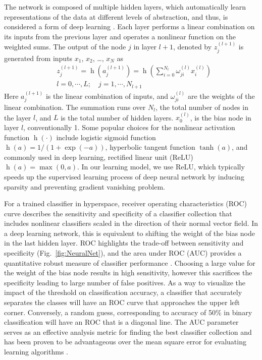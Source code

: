 \documentclass[aps,pra,reprint,superscriptaddress]{revtex4-1}
\DeclareMathOperator{\h}{h} %
\begin{document}
The network is composed of multiple hidden layers, which automatically learn representations of the data at different levels of abstraction, and thus, is considered a form of deep learning \cite{lecun2015deep, schmidhuber2015deep}. Each layer performs a linear combination on its inputs from the previous layer and operates a nonlinear function on the weighted sums. The output of the node $j$ in layer $l+1$, denoted by $z_j^{(l+1)}$ is generated from inputs $x_1$, $x_2$, \ldots, $x_N$ as
\begin{equation}
\begin{split}
& z_j^{(l+1)} = \h(a_j^{(l+1)}) = \h(\sum_{i=0}^{N_l} \omega_{ji}^{(l)} x_i^{(l)})\\
& l=0,\cdots,L;\quad j=1,\cdots,N_{l+1}
\end{split}
\end{equation}
Here $a_j^{(l+1)}$ is the linear combination of inputs, and $\omega_{ji}^{(l)}$ are the weights of the linear combination. The summation runs over $N_l$, the total number of nodes in the layer $l$, and $L$ is the total number of hidden layers. $x_0^{(l)}$, is the bias node in layer $l$, conventionally 1. Some popular choices for the nonlinear activation function $\h(\cdot)$ include logistic sigmoid function $\h(a)=1/(1+\exp(-a))$, hyperbolic tangent function $\tanh(a)$, and commonly used in deep learning, rectified linear unit (ReLU) $\h(a) = \max(0,a)$. In our learning model, we use ReLU, which typically speeds up the supervised learning process of deep neural network by inducing sparsity and preventing gradient vanishing problem. 

For a trained classifier in hyperspace, receiver operating characteristics (ROC) curve describes the sensitivity and specificity of a classifier collection that includes nonlinear classifiers scaled in the direction of their normal vector field. In a deep learning network, this is equivalent to shifting the weight of the bias node in the last hidden layer. ROC highlights the trade-off between sensitivity and specificity (Fig.~\ref{fig:NeuralNet}), and the area under ROC (AUC) provides a quantitative robust measure of classifier performance \cite{hanley1982meaning, ling2003auc, cortes2004auc, liu2008roc}. Choosing a large value for the weight of the bias node results in high sensitivity, however this sacrifices the specificity leading to large number of false positives. As a way to visualize the impact of the threshold on classification accuracy, a classifier that accurately separates the classes will have an ROC curve that approaches the upper left corner. Conversely, a random guess, corresponding to accuracy of 50\% in binary classification will have an ROC that is a diagonal line. The AUC parameter serves as an effective analysis metric for finding the best classifier collection and has been proven to be advantageous over the mean square error for evaluating learning algorithms \cite{verrelst1998use}. 
\end{document}
